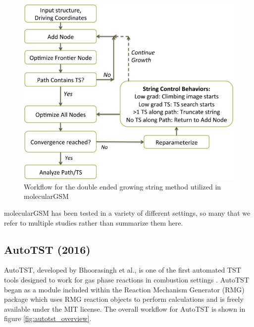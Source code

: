 \documentclass[preprint, 11pt]{elsarticle} %
\begin{document}
\begin{figure}
    \centering
    \includegraphics[width=5in]{se-gsm}
    \caption{Workflow for the double ended growing string method utilized in molecularGSM \cite{}}
    \label{fig:se-gsm}
\end{figure}

molecularGSM has been tested in a variety of different settings, so many that we refer to multiple studies  rather than summarize them here.


\subsection{AutoTST (2016)}

AutoTST, developed by Bhoorasingh et al., is one of the first automated TST tools designed to work for gas phase reactions in combustion settings \cite{bhoorasingh:2017}.
AutoTST began as a module included within the Reaction Mechanism Generator (RMG) package which uses RMG reaction objects to perform calculations and is freely available under the MIT license. 
The overall workflow for AutoTST is shown in figure \ref{fig:autotst_overview}.
\end{document}
